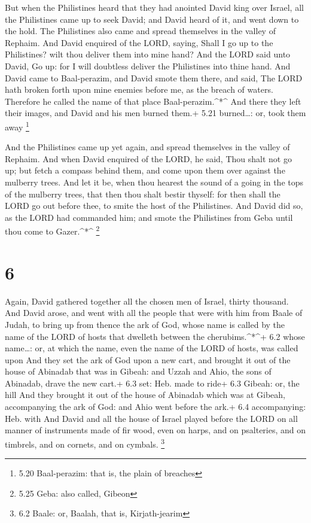  But when the Philistines heard that they had anointed
David king over Israel, all the Philistines came up to seek David; and
David heard of it, and went down to the hold.  The
Philistines also came and spread themselves in the valley of Rephaim.
 And David enquired of the LORD, saying, Shall I go up to
the Philistines? wilt thou deliver them into mine hand? And the LORD
said unto David, Go up: for I will doubtless deliver the Philistines
into thine hand.  And David came to Baal-perazim, and David
smote them there, and said, The LORD hath broken forth upon mine enemies
before me, as the breach of waters. Therefore he called the name of that
place Baal-perazim.\^{}*\^{}  And there they left their
images, and David and his men burned them.+ 5.21 burned\ldots: or, took
them away \footnote{5.20 Baal-perazim: that is, the plain of breaches}

 And the Philistines came up yet again, and spread
themselves in the valley of Rephaim.  And when David
enquired of the LORD, he said, Thou shalt not go up; but fetch a compass
behind them, and come upon them over against the mulberry trees.
 And let it be, when thou hearest the sound of a going in
the tops of the mulberry trees, that then thou shalt bestir thyself: for
then shall the LORD go out before thee, to smite the host of the
Philistines.  And David did so, as the LORD had commanded
him; and smote the Philistines from Geba until thou come to
Gazer.\^{}*\^{} \footnote{5.25 Geba: also called, Gibeon}

\hypertarget{section-5}{%
\section{6}\label{section-5}}

 Again, David gathered together all the chosen men of
Israel, thirty thousand.  And David arose, and went with all
the people that were with him from Baale of Judah, to bring up from
thence the ark of God, whose name is called by the name of the LORD of
hosts that dwelleth between the cherubims.\^{}*\^{}+ 6.2 whose
name\ldots: or, at which the name, even the name of the LORD of hosts,
was called upon  And they set the ark of God upon a new
cart, and brought it out of the house of Abinadab that was in Gibeah:
and Uzzah and Ahio, the sons of Abinadab, drave the new cart.+ 6.3 set:
Heb. made to ride+ 6.3 Gibeah: or, the hill  And they
brought it out of the house of Abinadab which was at Gibeah,
accompanying the ark of God: and Ahio went before the ark.+ 6.4
accompanying: Heb. with  And David and all the house of
Israel played before the LORD on all manner of instruments made of fir
wood, even on harps, and on psalteries, and on timbrels, and on cornets,
and on cymbals. \footnote{6.2 Baale: or, Baalah, that is, Kirjath-jearim}

